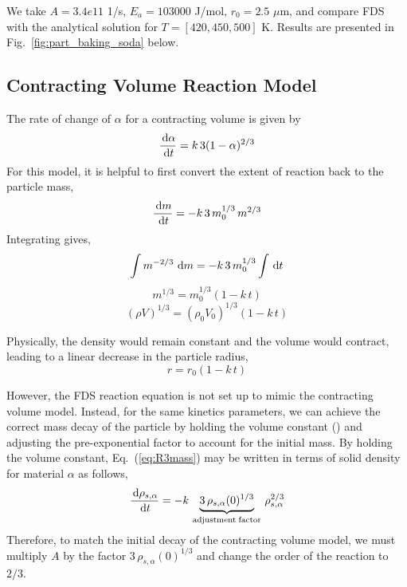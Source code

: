 \documentclass[11pt]{book}
\begin{document}
We take $A = 3.4e11$ 1/s, $E_a = 103000$ J/mol, $r_0 = 2.5$ $\mu$m, and compare FDS with the analytical solution for $T=[420, 450, 500]$ K.  Results are presented in Fig.~\ref{fig:part_baking_soda} below.

\subsection*{Contracting Volume Reaction Model}

The rate of change of $\alpha$ for a contracting volume is given by \cite{Khawam:2006}
\begin{equation}
\frac{\,\mathrm{d} \alpha}{\,\mathrm{d} t} = k \, 3(1-\alpha)^{2/3}
\end{equation}
For this model, it is helpful to first convert the extent of reaction back to the particle mass,
\begin{equation}
\label{eq:R3mass}
\frac{\,\mathrm{d} m}{\,\mathrm{d} t} = - k \, 3 \, m_0^{1/3} \, m^{2/3}
\end{equation}
Integrating gives,
\begin{equation}
\int m^{-2/3} \,\,\mathrm{d} m = -k \, 3 \, m_0^{1/3} \int \,\mathrm{d} t
\end{equation}
\begin{equation}
m^{1/3} = m_0^{1/3} (1-k \, t)
\end{equation}
\begin{equation}
(\rho V)^{1/3} = (\rho_0 V_0)^{1/3} (1-k \, t)
\end{equation}

Physically, the density would remain constant and the volume would contract, leading to a linear decrease in the particle radius,
\begin{equation}
r = r_0 (1-k \, t)
\end{equation}

However, the FDS reaction equation is not set up to mimic the contracting volume model.  Instead, for the same kinetics parameters, we can achieve the correct mass decay of the particle by holding the volume constant () and adjusting the pre-exponential factor to account for the initial mass.  By holding the volume constant, Eq.~(\ref{eq:R3mass}) may be written in terms of solid density for material $\alpha$ as follows,
\begin{equation}
\label{eq:R3rho}
\frac{\,\mathrm{d} \rho_{s,\alpha}}{\,\mathrm{d} t} = - k \, \underbrace{3 \, \rho_{s,\alpha}(0)^{1/3}}_{\mathrm{adjustment \; factor}} \, \rho_{s,\alpha}^{2/3}
\end{equation}
Therefore, to match the initial decay of the contracting volume model, we must multiply $A$ by the factor $3 \, \rho_{s,\alpha}(0)^{1/3}$ and change the order of the reaction to $2/3$.
\end{document}
